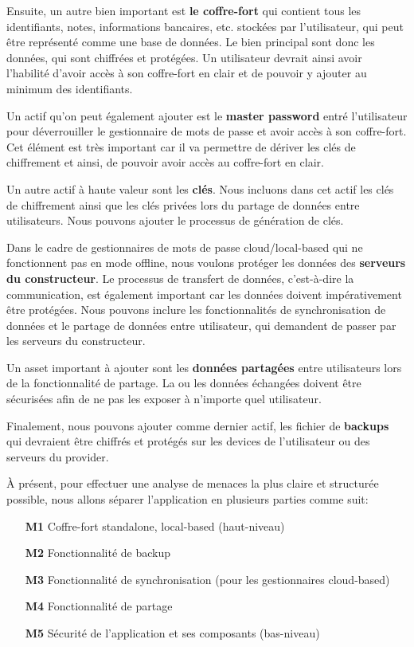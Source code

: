 Ensuite, un autre bien important est \textbf{le coffre-fort} qui contient tous les identifiants, notes, informations bancaires, etc. stockées par l'utilisateur, qui peut être représenté comme une base de données. Le bien principal sont donc les données, qui sont chiffrées et protégées. Un utilisateur devrait ainsi avoir l'habilité d'avoir accès à son coffre-fort en clair et de pouvoir y ajouter au minimum des identifiants.

Un actif qu'on peut également ajouter est le \textbf{master password} entré l'utilisateur pour déverrouiller le gestionnaire de mots de passe et avoir accès à son coffre-fort. Cet élément est très important car il va permettre de dériver les clés de chiffrement et ainsi, de pouvoir avoir accès au coffre-fort en clair.

Un autre actif à haute valeur sont les \textbf{clés}. Nous incluons dans cet actif les clés de chiffrement ainsi que les clés privées lors du partage de données entre utilisateurs. Nous pouvons ajouter le processus de génération de clés.

Dans le cadre de gestionnaires de mots de passe cloud/local-based qui ne fonctionnent pas en mode offline, nous voulons protéger les données des \textbf{serveurs du constructeur}. Le processus de transfert de données, c'est-à-dire la communication, est également important car les données doivent impérativement être protégées. Nous pouvons inclure les fonctionnalités de synchronisation de données et le partage de données entre utilisateur, qui demandent de passer par les serveurs du constructeur.

Un asset important à ajouter sont les \textbf{données partagées} entre utilisateurs lors de la fonctionnalité de partage. La ou les données échangées doivent être sécurisées afin de ne pas les exposer à n'importe quel utilisateur. 

Finalement, nous pouvons ajouter comme dernier actif, les fichier de \textbf{backups} qui devraient être chiffrés et protégés sur les devices de l'utilisateur ou des serveurs du provider.

À présent, pour effectuer une analyse de menaces la plus claire et structurée possible, nous allons séparer l'application en plusieurs parties comme suit:

\begin{enumerate}
	\item[\textbf{M1}] Coffre-fort standalone, local-based (haut-niveau)
	\item[\textbf{M2}] Fonctionnalité de backup
	\item[\textbf{M3}] Fonctionnalité de synchronisation (pour les gestionnaires cloud-based)
	\item[\textbf{M4}] Fonctionnalité de partage
	\item[\textbf{M5}] Sécurité de l'application et ses composants (bas-niveau)
\end{enumerate}

